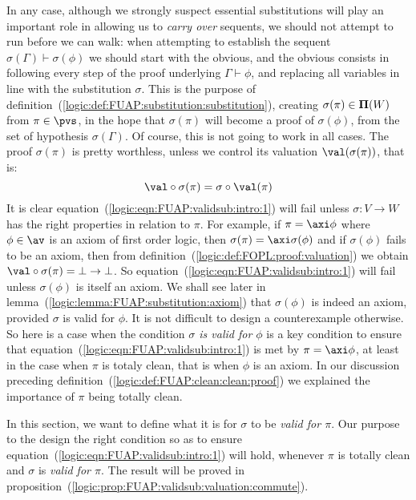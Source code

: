 In any case, although we strongly suspect essential substitutions
will play an important role in allowing us to {\em carry over}
sequents, we should not attempt to run before we can walk: when
attempting to establish the sequent
$\sigma(\Gamma)\vdash\sigma(\phi)$ we should start with the obvious,
and the obvious consists in following every step of the proof
underlying $\Gamma\vdash\phi$, and replacing all variables in line
with the substitution $\sigma$. This is the purpose of
definition~(\ref{logic:def:FUAP:substitution:substitution}),
creating $\sigma(\pi)\in{\bf\Pi}(W)$ from $\pi\in\pvs$, in the hope
that $\sigma(\pi)$ will become a proof of $\sigma(\phi)$, from the
set of hypothesis $\sigma(\Gamma)$. Of course, this is not going to
work in all cases. The proof $\sigma(\pi)$ is pretty worthless,
unless we control its valuation $\val(\sigma(\pi))$, that is:
    \begin{equation}\label{logic:eqn:FUAP:validsub:intro:1}
    \val\circ\sigma(\pi)=\sigma\circ\val(\pi)
    \end{equation}
It is clear equation~(\ref{logic:eqn:FUAP:validsub:intro:1}) will
fail unless $\sigma:V\to W$ has the right properties in relation to
$\pi$. For example, if $\pi=\axi\phi$ where $\phi\in\av$ is an axiom
of first order logic, then $\sigma(\pi)=\axi\sigma(\phi)$ and if
$\sigma(\phi)$ fails to be an axiom, then from
definition~(\ref{logic:def:FOPL:proof:valuation}) we obtain
$\val\circ\sigma(\pi)=\bot\to\bot$. So
equation~(\ref{logic:eqn:FUAP:validsub:intro:1}) will fail unless
$\sigma(\phi)$ is itself an axiom. We shall see later in
lemma~(\ref{logic:lemma:FUAP:substitution:axiom}) that
$\sigma(\phi)$ is indeed an axiom, provided $\sigma$ is valid for
$\phi$. It is not difficult to design a counterexample otherwise. So
here is a case when the condition {\em $\sigma$ is valid for $\phi$}
is a key condition to ensure that
equation~(\ref{logic:eqn:FUAP:validsub:intro:1}) is met by
$\pi=\axi\phi$, at least in the case when $\pi$ is totaly clean,
that is when $\phi$ is an axiom. In our discussion preceding
definition~(\ref{logic:def:FUAP:clean:clean:proof}) we explained the
importance of $\pi$ being totally clean.

In this section, we want to define what it is for $\sigma$ to be
{\em valid for $\pi$}. Our purpose to the design the right condition
so as to ensure equation~(\ref{logic:eqn:FUAP:validsub:intro:1})
will hold, whenever $\pi$ is totally clean and $\sigma$ is {\em
valid for $\pi$}. The result will be proved in
proposition~(\ref{logic:prop:FUAP:validsub:valuation:commute}).



